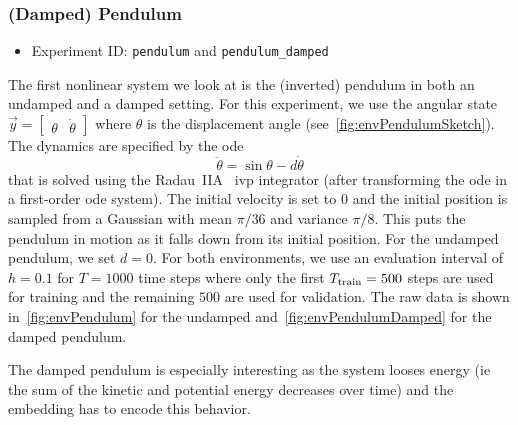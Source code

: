 		\subsubsection{(Damped) Pendulum}
			\begin{itemize}
				\item Experiment ID: \texttt{pendulum} and \texttt{pendulum\_damped}
			\end{itemize}

			The first nonlinear system we look at is the (inverted) pendulum in both an undamped and a damped setting. For this experiment, we use the angular state \( \vec{y} = \begin{bmatrix} \theta & \dot{\theta} \end{bmatrix} \) where \(\theta\) is the displacement angle (see~\autoref{fig:envPendulumSketch}). The dynamics are specified by the \ac{ode}
			\begin{equation*}
				\ddot{\theta} = \sin\theta - d \dot{\theta}
			\end{equation*}
			that is solved using the Radau~IIA~\cite{guglielmiImplementingRadauIIA2001} \ac{ivp} integrator (after transforming the \ac{ode} in a first-order \ac{ode} system). The initial velocity is set to \(0\) and the initial position is sampled from a Gaussian with mean \( \pi/36 \) and variance \( \pi/8 \). This puts the pendulum in motion as it falls down from its initial position. For the undamped pendulum, we set \( d = 0 \). For both environments, we use an evaluation interval of \( h = 0.1 \) for \( T = 1000 \) time steps where only the first \( T_{\mathrm{train}} = 500 \) steps are used for training and the remaining \(500\) are used for validation. The raw data is shown in~\autoref{fig:envPendulum} for the undamped and~\autoref{fig:envPendulumDamped} for the damped pendulum.

			The damped pendulum is especially interesting as the system looses energy (\ac{ie} the sum of the kinetic and potential energy decreases over time) and the embedding has to encode this behavior.

